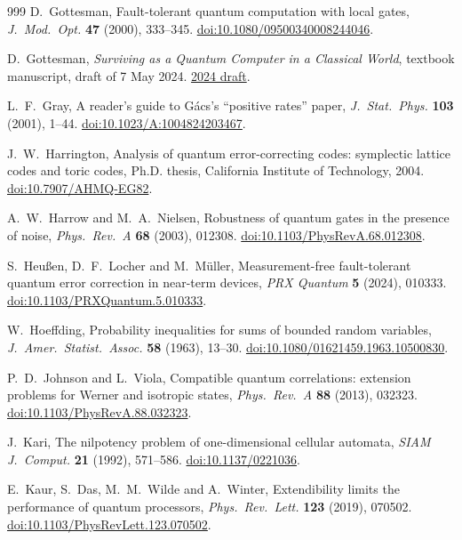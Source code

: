 \begin{thebibliography}{999}
D.~Gottesman,
Fault-tolerant quantum computation with local gates,
\emph{J.~Mod.~Opt.} \textbf{47} (2000), 333--345.
\href{https://doi.org/10.1080/09500340008244046}{doi:10.1080/09500340008244046}.

D.~Gottesman,
\emph{Surviving as a Quantum Computer in a Classical World},
textbook manuscript, draft of 7 May 2024.
\href{https://www.cs.umd.edu/~dgottesm/QECCbook-2024.pdf}{2024 draft}.

L.~F.~Gray,
A reader's guide to G\'acs's ``positive rates'' paper,
\emph{J.~Stat.~Phys.} \textbf{103} (2001), 1--44.
\href{https://doi.org/10.1023/A:1004824203467}{doi:10.1023/A:1004824203467}.

J.~W.~Harrington,
Analysis of quantum error-correcting codes: symplectic lattice codes and toric codes,
Ph.D. thesis, California Institute of Technology, 2004.
\href{https://doi.org/10.7907/AHMQ-EG82}{doi:10.7907/AHMQ-EG82}.

A.~W.~Harrow and M.~A.~Nielsen,
Robustness of quantum gates in the presence of noise,
\emph{Phys.~Rev.~A} \textbf{68} (2003), 012308.
\href{https://doi.org/10.1103/PhysRevA.68.012308}{doi:10.1103/PhysRevA.68.012308}.

S.~Heu\ss en, D.~F.~Locher and M.~M\"uller,
Measurement-free fault-tolerant quantum error correction in near-term devices,
\emph{PRX Quantum} \textbf{5} (2024), 010333.
\href{https://doi.org/10.1103/PRXQuantum.5.010333}{doi:10.1103/PRXQuantum.5.010333}.

W.~Hoeffding,
Probability inequalities for sums of bounded random variables,
\emph{J.~Amer.~Statist.~Assoc.} \textbf{58} (1963), 13--30.
\href{https://doi.org/10.1080/01621459.1963.10500830}{doi:10.1080/01621459.1963.10500830}.

P.~D.~Johnson and L.~Viola,
Compatible quantum correlations: extension problems for Werner and isotropic states,
\emph{Phys.~Rev.~A} \textbf{88} (2013), 032323.
\href{https://doi.org/10.1103/PhysRevA.88.032323}{doi:10.1103/PhysRevA.88.032323}.

J.~Kari,
The nilpotency problem of one-dimensional cellular automata,
\emph{SIAM J.~Comput.} \textbf{21} (1992), 571--586.
\href{https://doi.org/10.1137/0221036}{doi:10.1137/0221036}.

E.~Kaur, S.~Das, M.~M.~Wilde and A.~Winter,
Extendibility limits the performance of quantum processors,
\emph{Phys.~Rev.~Lett.} \textbf{123} (2019), 070502.
\href{https://doi.org/10.1103/PhysRevLett.123.070502}{doi:10.1103/PhysRevLett.123.070502}.


\end{thebibliography}
